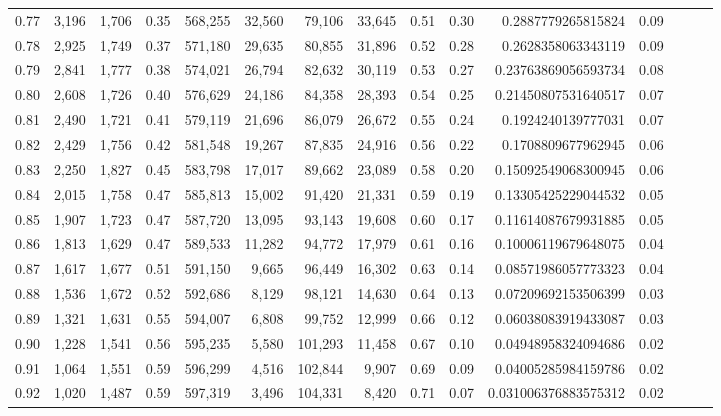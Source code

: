 \begin{tabular}{rrrrrrrrrrrrrrr}
0.77 &  3,196 &  1,706 &  0.35 &  568,255 &   32,560 &   79,106 &   33,645 &  0.51 &  0.30 &      0.2887779265815824 &      0.09 \\
0.78 &  2,925 &  1,749 &  0.37 &  571,180 &   29,635 &   80,855 &   31,896 &  0.52 &  0.28 &      0.2628358063343119 &      0.09 \\
0.79 &  2,841 &  1,777 &  0.38 &  574,021 &   26,794 &   82,632 &   30,119 &  0.53 &  0.27 &     0.23763869056593734 &      0.08 \\
0.80 &  2,608 &  1,726 &  0.40 &  576,629 &   24,186 &   84,358 &   28,393 &  0.54 &  0.25 &     0.21450807531640517 &      0.07 \\
0.81 &  2,490 &  1,721 &  0.41 &  579,119 &   21,696 &   86,079 &   26,672 &  0.55 &  0.24 &      0.1924240139777031 &      0.07 \\
0.82 &  2,429 &  1,756 &  0.42 &  581,548 &   19,267 &   87,835 &   24,916 &  0.56 &  0.22 &      0.1708809677962945 &      0.06 \\
0.83 &  2,250 &  1,827 &  0.45 &  583,798 &   17,017 &   89,662 &   23,089 &  0.58 &  0.20 &     0.15092549068300945 &      0.06 \\
0.84 &  2,015 &  1,758 &  0.47 &  585,813 &   15,002 &   91,420 &   21,331 &  0.59 &  0.19 &     0.13305425229044532 &      0.05 \\
0.85 &  1,907 &  1,723 &  0.47 &  587,720 &   13,095 &   93,143 &   19,608 &  0.60 &  0.17 &     0.11614087679931885 &      0.05 \\
0.86 &  1,813 &  1,629 &  0.47 &  589,533 &   11,282 &   94,772 &   17,979 &  0.61 &  0.16 &     0.10006119679648075 &      0.04 \\
0.87 &  1,617 &  1,677 &  0.51 &  591,150 &    9,665 &   96,449 &   16,302 &  0.63 &  0.14 &     0.08571986057773323 &      0.04 \\
0.88 &  1,536 &  1,672 &  0.52 &  592,686 &    8,129 &   98,121 &   14,630 &  0.64 &  0.13 &     0.07209692153506399 &      0.03 \\
0.89 &  1,321 &  1,631 &  0.55 &  594,007 &    6,808 &   99,752 &   12,999 &  0.66 &  0.12 &     0.06038083919433087 &      0.03 \\
0.90 &  1,228 &  1,541 &  0.56 &  595,235 &    5,580 &  101,293 &   11,458 &  0.67 &  0.10 &     0.04948958324094686 &      0.02 \\
0.91 &  1,064 &  1,551 &  0.59 &  596,299 &    4,516 &  102,844 &    9,907 &  0.69 &  0.09 &     0.04005285984159786 &      0.02 \\
0.92 &  1,020 &  1,487 &  0.59 &  597,319 &    3,496 &  104,331 &    8,420 &  0.71 &  0.07 &    0.031006376883575312 &      0.02 \\

\end{tabular}
